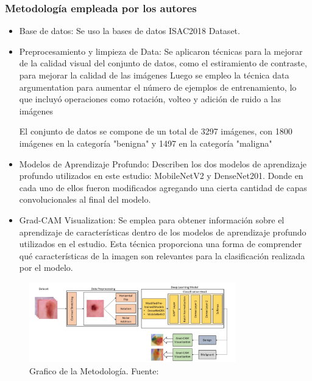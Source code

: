 \subsubsection{Metodología empleada por los autores}
\newcommand{\TISCone}{Base de datos: Se uso la bases de datos ISAC2018 Dataset.
}
\newcommand{\TISCtwo}{Preprocesamiento y limpieza de Data: Se aplicaron técnicas para la mejorar de la calidad visual del conjunto de datos, como el estiramiento de contraste, para mejorar la calidad de las imágenes
Luego se empleo la técnica data argumentation para aumentar el número de ejemplos de entrenamiento, lo que incluyó operaciones como rotación, volteo y adición de ruido a las imágenes
	
El conjunto de datos se compone de un total de 3297 imágenes, con 1800 imágenes en la categoría "benigna" y 1497 en la categoría "maligna"
}

\newcommand {\TISCthree} {Modelos de Aprendizaje Profundo: Describen los dos modelos de aprendizaje profundo utilizados en este estudio: MobileNetV2 y DenseNet201. Donde en cada uno de ellos fueron modificados agregando una cierta cantidad de capas convolucionales al final del modelo.
	
}

\newcommand {\TISCfour} {Grad-CAM Visualization: Se emplea para obtener información sobre el aprendizaje de características dentro de los modelos de aprendizaje profundo utilizados en el estudio. Esta técnica proporciona una forma de comprender qué características de la imagen son relevantes para la clasificación realizada por el modelo.}



\begin{itemize}
	\item \TISCone
	\item \TISCtwo
	\item \TISCthree
	\item \TISCfour
	
	
\end{itemize}


\begin{figure}[h]
	\begin{center}
		\includegraphics[width=0.8\textwidth]{2/figuras/metodo_ultimo.png}
		\caption{Grafico de la Metodología. Fuente: \cite{goceri2023classification}}
		\label{1:fig 4}
	\end{center}
\end{figure}




